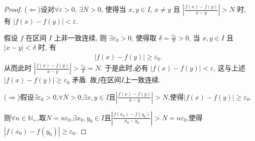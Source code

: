 \documentclass[lang=cn,newtx,10pt,scheme=chinese]{../Template/elegantbook}
\begin{document}
\begin{proof}
        ($\Leftarrow $)设对\(\forall \varepsilon >0\), \(\exists N>0\), 使得当 \(x,y\in I\), \(x\neq y\) 且 \(\left| \frac{f\left( x \right) -f\left( y \right)}{x-y} \right|>N\) 时, 有 \(\left| f\left( x \right) -f\left( y \right) \right|<\varepsilon\).

        假设 \(f\) 在区间 \(I\) 上非一致连续,
        则 \(\exists \varepsilon _0>0\), 使得取 \(\delta =\frac{\varepsilon _0}{N}>0\), 当 \(x,y\in I\) 且 \(\left| x-y \right|<\delta\) 时, 有
         \begin{align*}
            \left| f\left( x \right) -f\left( y \right) \right|\geqslant \varepsilon _0.
         \end{align*}
        从而此时 \(\left| \frac{f\left( x \right) -f\left( y \right)}{x-y} \right|>\frac{\varepsilon _0}{\delta}=N\).
        于是此时,必有 \(\left| f\left( x \right) -f\left( y \right) \right|<\varepsilon\), 这与上述 \(\left| f\left( x \right) -f\left( y \right) \right|\geqslant \varepsilon _0\) 矛盾. 故\(f\)在区间\(I\)上一致连续.

        ($\Rightarrow $)假设\(\exists \varepsilon _0>0\),\(\forall N>0\),\(\exists x,y\in I\)且\(\left| \frac{f\left( x \right) -f\left( y \right)}{x-y} \right|>N\),使得\(\left| f\left( x \right) -f\left( y \right) \right|\geq \varepsilon _0\).
        
        则\(\forall n\in \mathbb{N} _+\),取\(N = n\varepsilon _0\),\(\exists x_0,y_0\in I\)且\(\left| \frac{f\left( x_0 \right) -f\left( y_0 \right)}{x_0-y_0} \right|>N = n\varepsilon _0\),使得\(\left| f\left( x_0 \right) -f\left( y_0 \right) \right|\geq \varepsilon _0\).


\end{proof}
\end{document}
